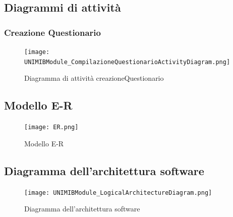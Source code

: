 \documentclass[12pt]{article}
\begin{document}
	\subsection{Diagrammi di attivit\`{a}}
	\subsubsection{Creazione Questionario}
	\begin{figure}[H]
		\centering
		\texttt{[image: UNIMIBModule\_CompilazioneQuestionarioActivityDiagram.png]}
		\caption{Diagramma di attività creazioneQuestionario}
	\end{figure}
	\subsection{Modello E-R}
	\begin{figure}[H]
		\texttt{[image: ER.png]}
		\caption{Modello E-R}
	\end{figure}
	\subsection{Diagramma dell'architettura software}
	\begin{figure}[H]
		\centering
		\texttt{[image: UNIMIBModule\_LogicalArchitectureDiagram.png]}
		\caption{Diagramma dell'architettura software}
	\end{figure}
	\newpage
\end{document}
